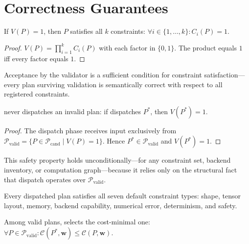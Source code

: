 \section{Correctness Guarantees}
\label{sec:correctness}

\begin{theorem}
\label{thm:soundness}
If $V(P) = 1$, then $P$ satisfies all $k$ constraints:
$\forall i \in \{1, \ldots, k\}: C_i(P) = 1$.
\end{theorem}

\begin{proof}
$V(P) = \prod_{i=1}^{k} C_i(P)$ with each factor in $\{0, 1\}$. The
product equals $1$ iff every factor equals $1$.
\end{proof}

Acceptance by the validator is a sufficient condition for constraint
satisfaction---every plan surviving validation is semantically correct
with respect to all registered constraints.

\begin{theorem}
\label{thm:dispatch}
\gate{} never dispatches an invalid plan: if \gate{} dispatches
$P^{*}$, then $V(P^{*}) = 1$.
\end{theorem}

\begin{proof}
The dispatch phase receives input exclusively from
$\mathcal{P}_{\text{valid}} = \{P \in \mathcal{P}_{\text{cand}} \mid
V(P) = 1\}$. Hence $P^{*} \in \mathcal{P}_{\text{valid}}$ and
$V(P^{*}) = 1$.
\end{proof}

This safety property holds unconditionally---for any constraint set,
backend inventory, or computation graph---because it relies only on
the structural fact that dispatch operates over
$\mathcal{P}_{\text{valid}}$.

\begin{corollary}
Every dispatched plan satisfies all seven default constraint types:
shape, tensor layout, memory, backend capability, numerical error,
determinism, and safety.
\end{corollary}

\begin{theorem}[Optimality]
\label{thm:optimality}
Among valid plans, \gate{} selects the cost-minimal one:
$\forall P \in \mathcal{P}_{\text{valid}}:
 \mathcal{C}(P^{*}, \mathbf{w}) \leq \mathcal{C}(P, \mathbf{w})$.
\end{theorem}

